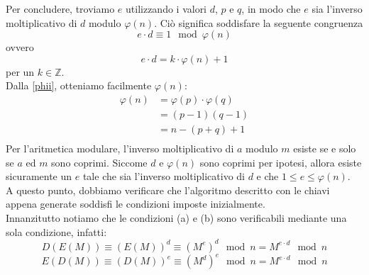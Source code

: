 \documentclass[italian,A4,12pt]{article}
\begin{document}
      Per concludere, troviamo $e$ utilizzando i valori $d$, $p$ e $q$, in modo che $e$ sia l'inverso moltiplicativo di $d$ modulo $\varphi(n)$. Ciò significa soddisfare la seguente congruenza
      $$e\cdot d \equiv 1 \mod{\varphi(n)}$$
      ovvero
      $$e\cdot d = k\cdot \varphi(n) +1$$
      per un $k\in\mathbb{Z}$.\\
      Dalla \eqref{phii}, otteniamo facilmente $\varphi(n)$:
      \begin{align*}
        \varphi(n) &= \varphi(p)\cdot\varphi(q)\\
        &= (p-1)(q-1)\\
        &= n-(p+q)+1\\
      \end{align*}
      Per l'aritmetica modulare, l'inverso moltiplicativo di $a$ modulo $m$ esiste se e solo se $a$ ed $m$ sono coprimi. Siccome $d$ e $\varphi(n)$ sono coprimi per ipotesi, allora esiste sicuramente un $e$ tale che sia l'inverso moltiplicativo di $d$ e che $1\leq e \leq \varphi(n)$.\\
      A questo punto, dobbiamo verificare che l'algoritmo descritto con le chiavi appena generate soddisfi le condizioni imposte inizialmente.\\
      Innanzitutto notiamo che le condizioni (a) e (b) sono verificabili mediante una sola condizione, infatti:
      \begin{equation}
        D(E(M))\equiv (E(M))^d\equiv (M^e)^d \mod{n}=M^{e\cdot d} \mod{n} \label{finale}
      \end{equation}
      $$E(D(M))\equiv (D(M))^e\equiv (M^d)^e \mod{n}=M^{e\cdot d} \mod{n}$$
\end{document}
